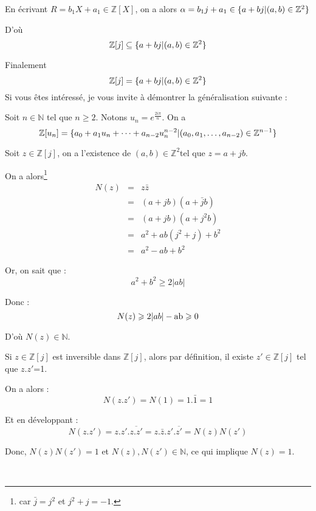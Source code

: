 En {\'e}crivant $R = b_1 X + a_1 \in \mathbb{Z} [X]$, on a alors $\alpha = b_1
j + a_1 \in \{ a + b j |   (a, b) \in \mathbb{Z}^2 \}$

D'o{\`u}
\[ \mathbb{Z} [j] \subseteq \{ a + b j |   (a, b) \in \mathbb{Z}^2
   \} \]


Finalement
\[ \mathbb{Z} [j] = \{ a + b j |   (a, b) \in \mathbb{Z}^2 \} \]
Si vous {\^e}tes int{\'e}ress{\'e}, je vous invite {\`a} d{\'e}montrer la
g{\'e}n{\'e}ralisation suivante :


Soit $n \in \mathbb{N} $ tel que $n \geqslant 2$. Notons $u_n = e^{\frac{2 i
\pi}{n}}$. On a
\[ \mathbb{Z} [u_n] = \{ a_0 + a_1 u_n + \cdots + a_{n - 2} u^{n - 2}_n  |
     (a_0, a_1, \ldots, a_{n - 2}) \in \mathbb{Z}^{n - 1} \} \]


 Soit $z \in \mathbb{Z} [j]$, on a l'existence de $(a, b) \in
\mathbb{Z}^2 $tel que $z = a + j b$.

On a alors\footnote{ car $\bar{j} = j^2$ et $j^2 + j = - 1$.}
\begin{eqnarray*}
  N (z) & = & z \bar{z}\\
  & = & (a + j b) (a + \bar{j} b)\\
  & = & (a + j b) (a + j^2 b)\\
  & = & a^2 + a b (j^2 + j) + b^2\\
  & = & a^2 - a b + b^2
\end{eqnarray*}


Or, on sait que :
\[ a^2 + b^2 \geqslant 2 | a b | \]


Donc :
\[ N (z) \geqslant 2 | a b | - \operatorname{ab} \geqslant 0 \]


D'o{\`u} $N (z) \in \mathbb{N}$.

Si $z \in \mathbb{Z} [j]$ est inversible dans $\mathbb{Z} [j]$, alors par
d{\'e}finition, il existe $z' \in \mathbb{Z} [j]$ tel que $z.z'$=1.

On a alors :
\[ N (z.z') = N (1) = 1. \bar{1} = 1 \]


Et en d{\'e}veloppant :
\[ N (z.z') = z.z' . \overline{z.z'} = z. \bar{z} .z' . \overline{z'} = N (z)
   N (z') \]


Donc, $N (z) N (z') = 1$ et $N (z), N (z') \in \mathbb{N}$, ce qui implique $N
(z) = 1$.

\


